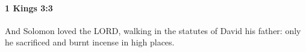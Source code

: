 
		\paragraph{1 Kings 3:3} %
			\label{1KINGS-3-3}

			And Solomon loved the LORD, walking in the statutes of David his father: only he sacrificed and burnt incense in high places.


